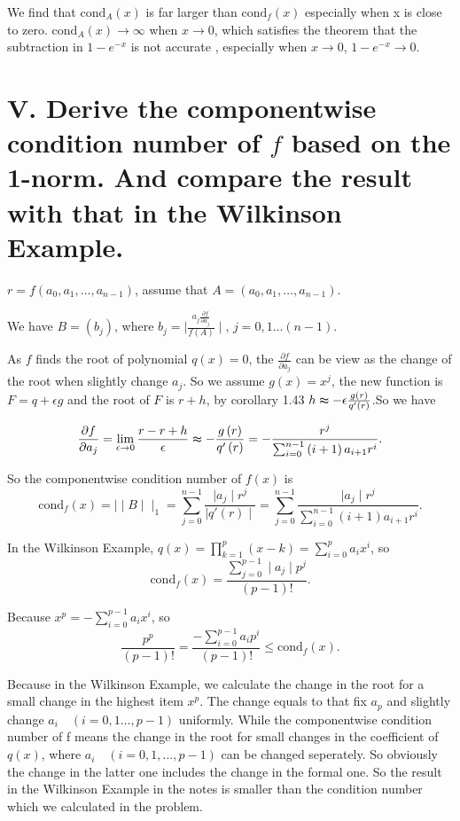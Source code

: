 \documentclass[twoside,a4paper]{article}
\begin{document}
We find that $\mathrm{cond}_A\left( x \right) $ is far larger than 
$\mathrm{cond}_f\left( x \right) $ especially when x is close to zero.
$\mathrm{cond}_A\left( x \right) \to \infty$ when $x\to 0$, which satisfies the 
theorem that the subtraction in $1-e^{-x}$ is not accurate
, especially when $x\to 0$, $1-e^{-x}\to 0$.

\section*{V. \small{Derive the componentwise condition number of $f$ based on the 1-norm. And compare the result with that in the Wilkinson Example.}}
$r=f\left( a_0,a_1,\ldots,a_{n-1} \right) $, assume that $A=\left( a_0,a_1,\ldots,a_{n-1} \right) $.

We have $B=\left( b_j \right) $, where $b_j= \mid \frac{a_j\frac{\partial f}{\partial a_j}}{f\left( A \right) } \mid$, $j=0,1\ldots\left( n-1 \right) $.

As $f$ finds the root of polynomial $q\left( x\right)=0 $, the $\frac{\partial f}{\partial a_j}$ can be view as the change of the root when slightly change $a_j$. So we assume  $g\left( x \right)=x^{j} $, the new function is $F=q+\epsilon g$ and the root of  $F$ is  $r+h$, by corollary 1.43  $h\thickapprox -\epsilon \frac{g\left( r \right) }{q'\left( r \right) }$.So we have

\[
	\frac{\partial f}{\partial a_j}=\lim_{\epsilon\to 0}\frac{r-r+h}{\epsilon}\thickapprox -\frac{g\left( r \right) }{q'\left( r \right) }
	=-\frac{r^{j}}{\sum_{i=0}^{n-1}\left( i+1 \right)a_{i+1}r^{i} }
.\] 

So the componentwise condition number of $f\left( x \right) $ is 
\[
	\mathrm{cond}_f\left( x \right)= \mid  \mid B \mid  \mid _1=\sum_{j=0}^{n-1} 
	\frac{ \mid a_j \mid r^{j}}{ \mid q'\left( r \right)  \mid }
	=\sum_{j=0}^{n-1}\frac{\mid a_j \mid r^{j}}{\sum_{i=0}^{n-1}\left( i+1 \right)a_{i+1}r^{i}}
.\] 

In the Wilkinson Example, $q\left( x \right)=\prod_{k=1}^{p}\left( x-k \right)=\sum_{i=0}^{p}a_ix^{i}  $, so
\[
	\mathrm{cond}_f\left( x \right) =  \frac{\sum_{j=0}^{p-1} \mid a_j \mid p^{j}}{\left( p-1 \right)! } 
.\] 

Because $x^{p}=-\sum_{i=0}^{p-1}a_ix^{i}$, so
\[
	\frac{p^{p}}{\left( p-1 \right)! }=\frac{-\sum_{i=0}^{p-1}a_ip^{i}}{\left( p-1 \right)! }\le \mathrm{cond}_f\left( x \right) 
.\] 

Because in the Wilkinson Example, we calculate the change in the root for a small change in the highest item $x^{p}$. 
The change equals to that fix $a_p$ and slightly change  $a_i\quad\left( i=0,1\ldots,p-1 \right) $ uniformly.
While the componentwise condition number of f means the change in the root for small changes in the coefficient of 
$q\left( x \right) $, where $a_i\quad\left( i=0,1,\ldots,p-1 \right) $ can be changed seperately. So obviously the change in the latter
one includes the change in the formal one. So the result in the Wilkinson Example in the notes is smaller than the condition number
which we calculated in the problem.
\end{document}
